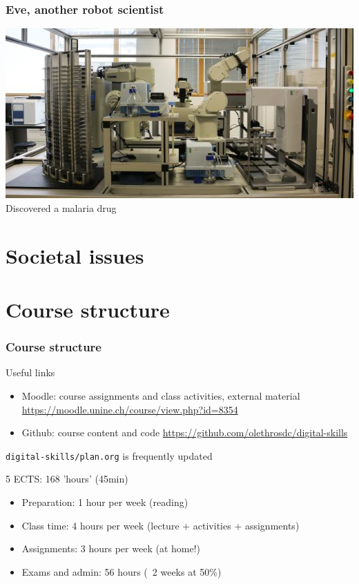 \documentclass{beamer}
\begin{document}
\begin{frame}
  \frametitle{Eve, another robot scientist}
  \includegraphics[width=\textwidth]{figures/eve.jpg}
  Discovered a malaria drug
\end{frame}

\section{Societal issues}


\section{Course structure}

\begin{frame}
  \frametitle{Course structure}
  \begin{block}{Useful links}
    \begin{itemize}
    \item Moodle: course assignments and class activities, external material
      \url{https://moodle.unine.ch/course/view.php?id=8354}
    \item Github: course content and code \url{https://github.com/olethrosdc/digital-skills}
    \end{itemize}
    \texttt{digital-skills/plan.org} is frequently updated
  \end{block}
  \begin{block}{5 ECTS: 168 'hours' (45min)}
    \begin{itemize}
    \item Preparation: 1 hour per week (reading)
    \item Class time: 4 hours per week (lecture + activities + assignments)
    \item Assignments: 3 hours per week (at home!)
    \item Exams and admin: 56 hours (~2 weeks at 50\%)
    \end{itemize}
  \end{block}
\end{frame}
\end{document}
